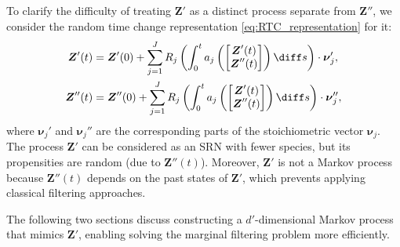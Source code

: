 \begin{center}
\end{center}

To clarify the difficulty of treating $\boldsymbol{Z}'$ as a distinct process separate from $\boldsymbol{Z}''$, we consider the random time change representation \eqref{eq:RTC_representation} for it:
\begin{equation}
\label{eq:RTC_splited}
\begin{aligned}
    \boldsymbol{Z}'(t)  &= \boldsymbol{Z}'(0) + \sum_{j=1}^{J} R_j \left( \int_0^t  a_j \left( \begin{bmatrix} \boldsymbol{Z}'(t) \\ \boldsymbol{Z}''(t)\end{bmatrix} \right) \diff s \right) \cdot \boldsymbol{\nu}_j' , \\ 
    \boldsymbol{Z}''(t)  &= \boldsymbol{Z}''(0) + \sum_{j=1}^{J} R_j \left( \int_0^t  a_j \left( \begin{bmatrix} \boldsymbol{Z}'(t) \\ \boldsymbol{Z}''(t)\end{bmatrix} \right) \diff s \right) \cdot \boldsymbol{\nu}_j'' , 
\end{aligned}
\end{equation}
where $\boldsymbol{\nu}_j'$ and $\boldsymbol{\nu}_j''$ are the corresponding parts of the stoichiometric vector $\boldsymbol{\nu}_j$. The process $\boldsymbol{Z}'$ can be considered as an \ac{SRN} with fewer species, but its propensities are random (due to $\boldsymbol{Z}''(t)$). Moreover, $\boldsymbol{Z}'$ is not a Markov process because $\boldsymbol{Z}''(t)$ depends on the past states of $\boldsymbol{Z}'$, which prevents applying classical filtering approaches. 

The following two sections discuss constructing a $d'$-dimensional Markov process that mimics $\boldsymbol{Z}'$, enabling solving the marginal filtering problem more efficiently.


